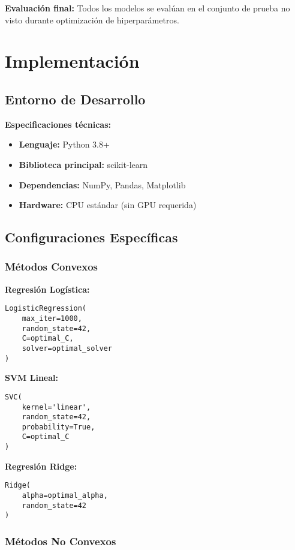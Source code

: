 \documentclass[12pt,a4paper]{article}
\begin{document}
\textbf{Evaluación final:}
Todos los modelos se evalúan en el conjunto de prueba no visto durante optimización de hiperparámetros.

\section{Implementación}

\subsection{Entorno de Desarrollo}

\textbf{Especificaciones técnicas:}
\begin{itemize}
    \item \textbf{Lenguaje:} Python 3.8+
    \item \textbf{Biblioteca principal:} scikit-learn \cite{pedregosa2011}
    \item \textbf{Dependencias:} NumPy, Pandas, Matplotlib
    \item \textbf{Hardware:} CPU estándar (sin GPU requerida)
\end{itemize}

\subsection{Configuraciones Específicas}

\subsubsection{Métodos Convexos}

\textbf{Regresión Logística:}
\begin{verbatim}
LogisticRegression(
    max_iter=1000,
    random_state=42,
    C=optimal_C,
    solver=optimal_solver
)
\end{verbatim}

\textbf{SVM Lineal:}
\begin{verbatim}
SVC(
    kernel='linear',
    random_state=42,
    probability=True,
    C=optimal_C
)
\end{verbatim}

\textbf{Regresión Ridge:}
\begin{verbatim}
Ridge(
    alpha=optimal_alpha,
    random_state=42
)
\end{verbatim}

\subsubsection{Métodos No Convexos}
\end{document}
